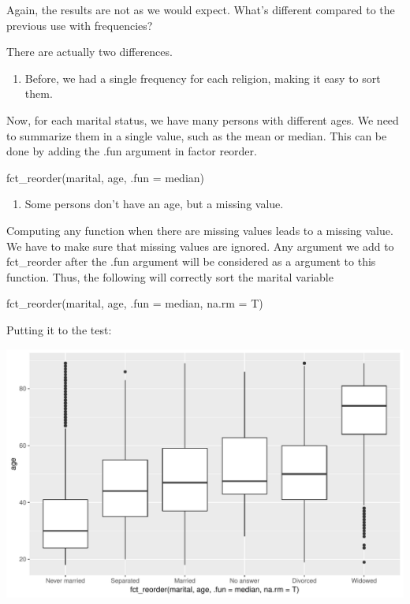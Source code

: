 \documentclass[]{tufte-book}
\newenvironment{Shaded}{}{}
\newcommand{\KeywordTok}[1]{\textcolor[rgb]{0.00,0.44,0.13}{\textbf{#1}}}
\newcommand{\DataTypeTok}[1]{\textcolor[rgb]{0.56,0.13,0.00}{#1}}
\newcommand{\StringTok}[1]{\textcolor[rgb]{0.25,0.44,0.63}{#1}}
\newcommand{\OperatorTok}[1]{\textcolor[rgb]{0.40,0.40,0.40}{#1}}
\newcommand{\NormalTok}[1]{#1}
\providecommand{\tightlist}{%
  \setlength{\itemsep}{0pt}\setlength{\parskip}{0pt}}
\begin{document}
Again, the results are not as we would expect. What's different compared
to the previous use with frequencies?

There are actually two differences.

\begin{enumerate}
\def\labelenumi{\arabic{enumi}.}
\tightlist
\item
  Before, we had a single frequency for each religion, making it easy to
  sort them.
\end{enumerate}

Now, for each marital status, we have many persons with different ages.
We need to summarize them in a single value, such as the mean or median.
This can be done by adding the .fun argument in factor reorder.

fct\_reorder(marital, age, .fun = median)

\begin{enumerate}
\def\labelenumi{\arabic{enumi}.}
\setcounter{enumi}{1}
\tightlist
\item
  Some persons don't have an age, but a missing value.
\end{enumerate}

Computing any function when there are missing values leads to a missing
value. We have to make sure that missing values are ignored. Any
argument we add to fct\_reorder after the .fun argument will be
considered as a argument to this function. Thus, the following will
correctly sort the marital variable

fct\_reorder(marital, age, .fun = median, na.rm = T)

Putting it to the test:

\begin{Shaded}
\end{Shaded}

\includegraphics{cleaning_tutorial_files/figure-latex/unnamed-chunk-90-1}
\end{document}
